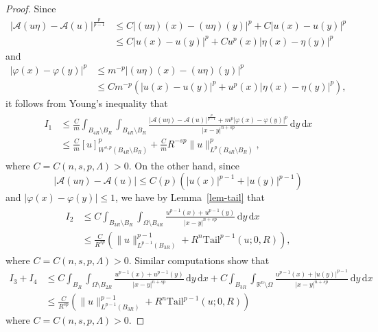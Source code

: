 \documentclass[11pt]{amsart}
\theoremstyle{plain}
\theoremstyle{definition}
\numberwithin{equation}{section}
\begin{document}
\begin{proof}
Since
\begin{align*}
|\mathcal{A}(u\eta)-\mathcal{A}(u)|^{\frac{p}{p-1}}
&\leq C |(u\eta)(x)-(u\eta)(y)|^p + C |u(x)-u(y)|^p \\
&\leq C |u(x)-u(y)|^p + C u^p(x) |\eta(x)-\eta(y)|^p
\end{align*}
and
\begin{align*}
|\varphi(x)-\varphi(y)|^p
&\leq m^{-p} |(u\eta)(x)-(u\eta)(y)|^p \\
&\leq Cm^{-p} (|u(x)-u(y)|^p + u^p(x) |\eta(x)-\eta(y)|^p),
\end{align*}
it follows from Young's inequality that
\begin{align}\label{eq-upper-I1}
\begin{split}
I_1
&\leq \frac{C}{m} \int_{B_{4R} \setminus B_R} \int_{B_{4R} \setminus B_R} \frac{|\mathcal{A}(u\eta)-\mathcal{A}(u)|^{\frac{p}{p-1}} + m^p |\varphi(x)-\varphi(y)|^p}{|x-y|^{n+sp}} \,\mathrm{d}y\,\mathrm{d}x \\
&\leq \frac{C}{m} [u]_{W^{s, p}(B_{4R} \setminus B_R)}^p + \frac{C}{m} R^{-sp} \|u\|_{L^p(B_{4R}\setminus B_R)}^p,
\end{split}
\end{align}
where $C=C(n, s, p, \Lambda)>0$. On the other hand, since
\begin{equation}\label{eq-A}
|\mathcal{A}(u\eta)-\mathcal{A}(u)| \leq C(p)(|u(x)|^{p-1} + |u(y)|^{p-1})
\end{equation}
and $|\varphi(x)-\varphi(y)| \leq 1$, we have by Lemma~\ref{lem-tail} that
\begin{align}\label{eq-upper-I2}
\begin{split}
I_2
&\leq C \int_{B_{3R} \setminus B_R} \int_{\Omega \setminus B_{4R}} \frac{u^{p-1}(x)+u^{p-1}(y)}{|x-y|^{n+sp}} \,\mathrm{d}y\,\mathrm{d}x \\
&\leq \frac{C}{R^{sp}} \left( \|u\|_{L^{p-1}(B_{3R})}^{p-1} + R^n \mathrm{Tail}^{p-1}(u; 0, R) \right),
\end{split}
\end{align}
where $C=C(n, s, p, \Lambda)>0$. Similar computations show that
\begin{equation}\label{eq-upper-I34}
\begin{split}
I_3 + I_4
&\leq C \int_{B_R} \int_{\Omega \setminus B_{2R}} \frac{u^{p-1}(x)+u^{p-1}(y)}{|x-y|^{n+sp}} \,\mathrm{d}y\,\mathrm{d}x + C \int_{B_{3R}} \int_{\mathbb{R}^n \setminus \Omega} \frac{u^{p-1}(x)+|u(y)|^{p-1}}{|x-y|^{n+sp}} \,\mathrm{d}y\,\mathrm{d}x \\
&\leq \frac{C}{R^{sp}} \left( \|u\|_{L^{p-1}(B_{3R})}^{p-1} + R^n \mathrm{Tail}^{p-1}(u; 0, R) \right)
\end{split}
\end{equation}
where $C=C(n, s, p, \Lambda)>0$.


\end{proof}
\end{document}
